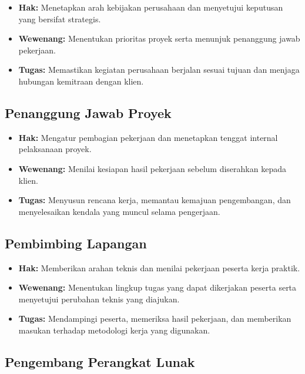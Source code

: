 \begin{itemize}[leftmargin=*, itemsep=0pt]
  \item \textbf{Hak:} Menetapkan arah kebijakan perusahaan dan menyetujui keputusan yang bersifat strategis.
  \item \textbf{Wewenang:} Menentukan prioritas proyek serta menunjuk penanggung jawab pekerjaan.
  \item \textbf{Tugas:} Memastikan kegiatan perusahaan berjalan sesuai tujuan dan menjaga hubungan kemitraan dengan klien.
\end{itemize}

\subsection{Penanggung Jawab Proyek}

\begin{itemize}[leftmargin=*, itemsep=0pt]
  \item \textbf{Hak:} Mengatur pembagian pekerjaan dan menetapkan tenggat internal pelaksanaan proyek.
  \item \textbf{Wewenang:} Menilai kesiapan hasil pekerjaan sebelum diserahkan kepada klien.
  \item \textbf{Tugas:} Menyusun rencana kerja, memantau kemajuan pengembangan, dan menyelesaikan kendala yang muncul selama pengerjaan.
\end{itemize}

\subsection{Pembimbing Lapangan}

\begin{itemize}[leftmargin=*, itemsep=0pt]
  \item \textbf{Hak:} Memberikan arahan teknis dan menilai pekerjaan peserta kerja praktik.
  \item \textbf{Wewenang:} Menentukan lingkup tugas yang dapat dikerjakan peserta serta menyetujui perubahan teknis yang diajukan.
  \item \textbf{Tugas:} Mendampingi peserta, memeriksa hasil pekerjaan, dan memberikan masukan terhadap metodologi kerja yang digunakan.
\end{itemize}

\subsection{Pengembang Perangkat Lunak}

